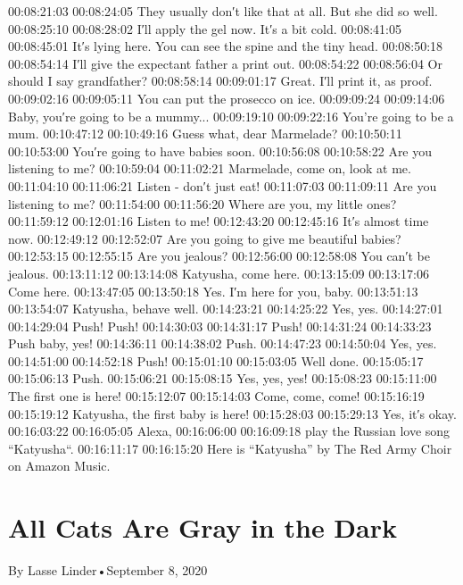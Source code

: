 \begin{itemize}
  00:08:21:03 00:08:24:05 They usually don′t like that at all. But she
  did so well. 00:08:25:10 00:08:28:02 I′ll apply the gel now. It′s a
  bit cold. 00:08:41:05 00:08:45:01 It′s lying here. You can see the
  spine and the tiny head. 00:08:50:18 00:08:54:14 I′ll give the
  expectant father a print out. 00:08:54:22 00:08:56:04 Or should I say
  grandfather? 00:08:58:14 00:09:01:17 Great. I′ll print it, as proof.
  00:09:02:16 00:09:05:11 You can put the prosecco on ice. 00:09:09:24
  00:09:14:06 Baby, you′re going to be a mummy... 00:09:19:10
  00:09:22:16 You're going to be a mum. 00:10:47:12 00:10:49:16 Guess
  what, dear Marmelade? 00:10:50:11 00:10:53:00 You′re going to have
  babies soon. 00:10:56:08 00:10:58:22 Are you listening to me?
  00:10:59:04 00:11:02:21 Marmelade, come on, look at me. 00:11:04:10
  00:11:06:21 Listen - don′t just eat! 00:11:07:03 00:11:09:11 Are you
  listening to me? 00:11:54:00 00:11:56:20 Where are you, my little
  ones? 00:11:59:12 00:12:01:16 Listen to me! 00:12:43:20 00:12:45:16
  It′s almost time now. 00:12:49:12 00:12:52:07 Are you going to give me
  beautiful babies? 00:12:53:15 00:12:55:15 Are you jealous? 00:12:56:00
  00:12:58:08 You can′t be jealous. 00:13:11:12 00:13:14:08 Katyusha,
  come here. 00:13:15:09 00:13:17:06 Come here. 00:13:47:05 00:13:50:18
  Yes. I′m here for you, baby. 00:13:51:13 00:13:54:07 Katyusha, behave
  well. 00:14:23:21 00:14:25:22 Yes, yes. 00:14:27:01 00:14:29:04 Push!
  Push! 00:14:30:03 00:14:31:17 Push! 00:14:31:24 00:14:33:23 Push baby,
  yes! 00:14:36:11 00:14:38:02 Push. 00:14:47:23 00:14:50:04 Yes, yes.
  00:14:51:00 00:14:52:18 Push! 00:15:01:10 00:15:03:05 Well done.
  00:15:05:17 00:15:06:13 Push. 00:15:06:21 00:15:08:15 Yes, yes, yes!
  00:15:08:23 00:15:11:00 The first one is here! 00:15:12:07 00:15:14:03
  Come, come, come! 00:15:16:19 00:15:19:12 Katyusha, the first baby is
  here! 00:15:28:03 00:15:29:13 Yes, it′s okay. 00:16:03:22 00:16:05:05
  Alexa, 00:16:06:00 00:16:09:18 play the Russian love song
  ``Katyusha``. 00:16:11:17 00:16:15:20 Here is ``Katyusha'' by The Red
  Army Choir on Amazon Music.
\end{itemize}

\hypertarget{all-cats-are-gray-in-the-dark-1}{%
\section{All Cats Are Gray in the
Dark}\label{all-cats-are-gray-in-the-dark-1}}

By Lasse Linder•September 8, 2020

